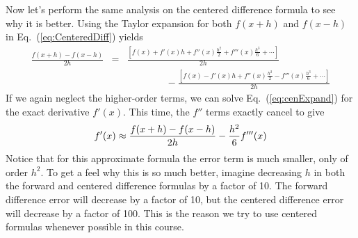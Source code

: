 Now let's perform the same analysis on the centered difference
formula to see why it is better. Using the Taylor expansion for both
$f(x+h)$ and $f(x-h)$ in Eq.~(\ref{eq:CenteredDiff}) yields
\begin{eqnarray}\label{eq:cenExpand}
    \frac{f(x+h)-f(x-h)}{2 h} &=&
    \frac{\left[f(x)+f'(x)h + f''(x) \frac{h^2}{2}+f'''(x) \frac{h^3}{6} + \cdots \right]}{2 h}
    \\
    & & \qquad \qquad -
    \frac{\left[ f(x)-f'(x)h + f''(x) \frac{h^2}{2}-f'''(x)\frac{h^3}{6} + \cdots \right] }{2 h}
    \nonumber
\end{eqnarray}
If we again neglect the higher-order terms, we can solve
Eq.~(\ref{eq:cenExpand}) for the exact derivative $f'(x)$. This time,
the $f''$ terms exactly cancel to give
\begin{equation} \label{eq:CenteredError}
    f'(x) \approx {f(x+h)-f(x-h) \over 2 h} - {h^2 \over 6} f'''(x)
\end{equation}
Notice that for this approximate formula the error term is much smaller, only
of order $h^2$. To get a feel why this is so much better, imagine decreasing
$h$ in both the forward and centered difference formulas by a factor of 10.
The forward difference error will decrease by a factor of 10, but the
centered difference error will decrease by a factor of 100. This is the
reason we try to use centered formulas whenever possible in this course.


